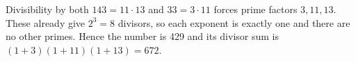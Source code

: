 Divisibility by both $143=11\cdot13$ and $33=3\cdot11$ forces prime factors $3,11,13$. These already give $2^3=8$ divisors, so each exponent is exactly one and there are no other primes. Hence the number is 429 and its divisor sum is $(1+3)(1+11)(1+13)=\boxed{672}$.
